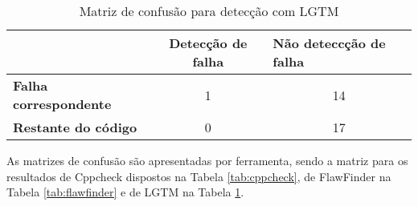 \begin{table}[ht]
  \begin{tabular}{@{}lcc@{}}
  \toprule
                      & \textbf{Detecção de falha} & \multicolumn{1}{l}{\textbf{Não deteccção de falha}} \\ \midrule
  \textbf{Falha correspondente} & 1                        & 14                                               \\
  \textbf{Restante do código} & 0                        & 17                                               \\ \bottomrule
  \end{tabular}
  \caption{Matriz de confusão para detecção com LGTM}
  \label{tab:lgtm}
  \end{table}

  As matrizes de confusão são apresentadas por ferramenta, sendo a matriz para os resultados de Cppcheck dispostos na Tabela \ref{tab:cppcheck}, de FlawFinder na Tabela \ref{tab:flawfinder} e de LGTM na Tabela \ref{tab:lgtm}.

